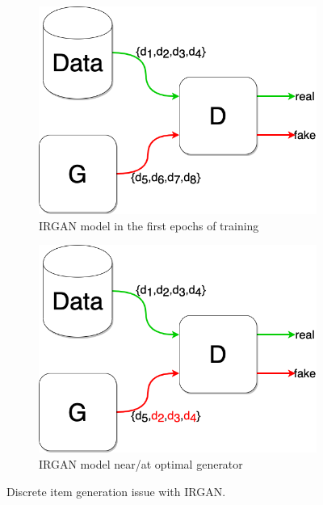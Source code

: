 \begin{figure}[htbp]
    \centering
    \begin{subfigure}[b]{0.48\textwidth}
        \centering
        \includegraphics[width=\textwidth]{model/irgan_problem1.png}
        \caption{IRGAN model in the first epochs of training}
        \label{fig:irgan_problem1}
    \end{subfigure}
    \hfill
    \begin{subfigure}[b]{0.48\textwidth}
        \centering
        \includegraphics[width=\textwidth]{model/irgan_problem2.png}
        \caption{IRGAN model near/at optimal generator}
        \label{fig:irgan_problem2}
    \end{subfigure}
    \caption{Discrete item generation issue with IRGAN.}
    \label{fig:irgan_problem}
\end{figure}

